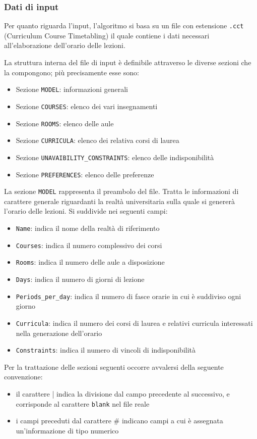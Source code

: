 \documentclass[11pt,a4paper]{article}
\begin{document}
\subsubsection*{Dati di input}\label{Algo_Input}
Per quanto riguarda l'input, l'algoritmo si basa su un file con estensione \verb|.cct| (Curriculum Course Timetabling) il quale contiene i dati necessari all'elaborazione dell'orario delle lezioni.

La struttura interna del file di input è definibile attraverso le diverse sezioni che la compongono; più precisamente esse sono:
\begin{itemize}
\item	Sezione \verb|MODEL|: informazioni generali
\item	Sezione \verb|COURSES|: elenco dei vari insegnamenti
\item	Sezione \verb|ROOMS|: elenco delle aule
\item	Sezione \verb|CURRICULA|: elenco dei relativa corsi di laurea
\item	Sezione \verb|UNAVAIBILITY_CONSTRAINTS|: elenco delle indisponibilità
\item	Sezione \verb|PREFERENCES|: elenco delle preferenze
\end{itemize}
La sezione \verb|MODEL| rappresenta il preambolo del file. Tratta le informazioni di carattere generale riguardanti la realtà universitaria sulla quale si genererà l'orario delle lezioni. Si suddivide nei seguenti campi:
\begin{itemize}
\item	\verb|Name|: indica il nome della realtà di riferimento
\item	\verb|Courses|: indica il numero complessivo dei corsi
\item	\verb|Rooms|: indica il numero delle aule a disposizione
\item	\verb|Days|: indica il numero di giorni di lezione
\item	\verb|Periods_per_day|: indica il numero di fasce orarie in cui è suddiviso ogni giorno
\item	\verb|Curricula|: indica il numero dei corsi di laurea e relativi curricula interessati nella generazione dell'orario
\item	\verb|Constraints|: indica il numero di vincoli di indisponibilità
\end{itemize}

Per la trattazione delle sezioni seguenti occorre avvalersi della seguente convenzione:
\begin{itemize}
\item il carattere | indica la divisione dal campo precedente al successivo, e corrisponde al carattere \verb|blank| nel file reale
\item i campi preceduti dal carattere \# indicano campi a cui è assegnata un'informazione di tipo numerico
\end{itemize}
\end{document}
